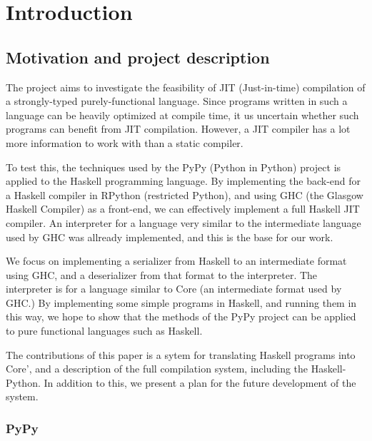 
\chapter{Introduction}

\section{Motivation and project description}

The project aims to investigate the feasibility of JIT (Just-in-time) 
compilation of a strongly-typed purely-functional language. Since
programs written in such a language can be heavily optimized at 
compile time, it us uncertain whether such programs can benefit from
JIT compilation. However, a JIT compiler has a lot more information to
work with than a static compiler. 

To test this, the techniques 
used by the PyPy (Python in Python) project is applied to the Haskell 
programming language. By implementing the back-end for a Haskell compiler 
in RPython (restricted Python), and using GHC (the Glasgow Haskell Compiler) 
as a front-end, we can effectively implement a full Haskell JIT compiler. An 
interpreter for a language very similar to the intermediate language used
by GHC was allready implemented, and this is the base for our work.

We focus on implementing a serializer from Haskell to an intermediate
format using GHC, and a deserializer from that format to the interpreter. The 
interpreter is for a language similar to Core (an intermediate format used by GHC.)
By implementing some simple programs in Haskell, and running them in this way, 
we hope to show that the methods of the PyPy project can be applied to pure 
functional languages such as Haskell.

The contributions of this paper is a sytem for translating Haskell programs
into Core', and a description of the full compilation system, including the 
Haskell-Python. In addition to this,
we present a plan for the future development of the system.

\subsection{PyPy}

